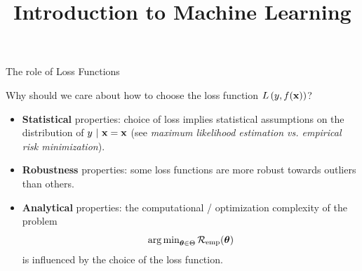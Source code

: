 \documentclass[11pt,compress,t,notes=noshow, xcolor=table]{beamer}
\title{Introduction to Machine Learning}
\institute{\href{https://compstat-lmu.github.io/lecture_i2ml/}{compstat-lmu.github.io/lecture\_i2ml}}
\date{}
\begin{document}


\begin{vbframe}{The role of Loss Functions}

Why should we care about how to choose the loss function $L\left(y, f(\mathbf{x})\right)$?

\begin{itemize}
\item \textbf{Statistical} properties: choice of loss implies statistical assumptions on the distribution of $y ~|~ \mathbf{x} = \mathbf{x}$ (see \emph{maximum likelihood estimation vs.
empirical risk minimization}). 
\item \textbf{Robustness} properties: some loss functions are more robust towards outliers than others. 
\item \textbf{Analytical} properties: the computational / optimization complexity of the problem 
$$
\operatorname{arg\,min}_{\bm{\theta} \in \Theta} \mathcal{R}_{\text{emp}}(\bm{\theta})
$$
is influenced by the choice of the loss function. 
\end{itemize}

\end{vbframe}

\end{document}
